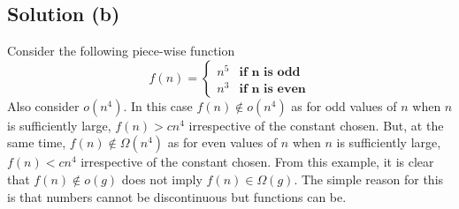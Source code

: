\documentclass[a4paper,12pt]{article} %
\begin{document}
\subsection*{Solution (b)}
Consider the following piece-wise function 
\[  f(n) =  \left\{
\begin{array}{ll}
      n^5 &\textbf{if n is odd}\\
      n^3 &\textbf{if n is even}
\end{array} 
\right. \]
Also consider $o(n^4)$. In this case $f(n) \notin o(n^4)$ as for odd values of $n$ when $n$ is sufficiently large, $f(n) > cn^4$ irrespective of the constant chosen. But, at the same time, $f(n) \notin \Omega(n^4)$ as for even values of $n$ when $n$ is sufficiently large, $f(n) < cn^4$ irrespective of the constant chosen. From this example, it is clear that $f(n) \notin o(g)$ does not imply $f(n) \in \Omega(g)$. The simple reason for this is that numbers cannot be discontinuous but functions can be.
\end{document}

